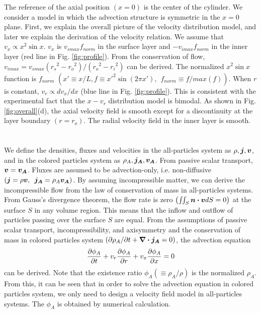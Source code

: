 \documentclass[prl,twocolumn,superscriptaddress]{revtex4}
\begin{document}
The reference of the axial position $(x=0)$ is the center of the cylinder. We consider a model in which the advection structure is symmetric in the $x=0$ plane. First, we explain the overall picture of the velocity distribution model, and later we explain the derivation of the velocity relation. We assume that $v_x\propto x^2\sin x$.  $v_x$ is $v_{smax}f_{norm}$ in the surface layer and $-v_{imax}f_{norm}$ in the inner layer (red line in Fig. \ref{fig:profile}). From the conservation of flow, $v_{imax}=v_{smax}({r_s}^2-{r_o}^2)/({r_o}^2-{r_i}^2)$ can be derived. The normalized $x^2\sin x$ function is $f_{norm}$ $(x'\equiv x/L, f\equiv {x'}^2\sin(2\pi x'),\hspace{5pt}f_{norm}\equiv f/max(f))$. When $r$ is constant, $v_r\propto dv_x/dx$ (blue line in Fig. \ref{fig:profile}). This is consistent with the experimental fact that the $x-v_r$ distribution model is bimodal. As shown in Fig. \ref{fig:overall}(d), the axial velocity field is smooth except for a discontinuity at the layer boundary $(r=r_o)$. The radial velocity field in the inner layer is smooth. \\
\\
 \\
We define the densities, fluxes and velocities in the all-particles system as $\rho, \vb*{j}, \vb*{v}$, and in the colored particles system as $\rho_A, \vb*{j_A}, \vb*{v_A}$. From passive scalar transport, $\vb*{v} = \vb*{v_A}$. Fluxes are assumed to be advection-only, i.e. non-diffusive $(\vb*{j} = \rho\vb*{v},\hspace{5pt}\vb*{j_A} = \rho_A\vb*{v_A})$. By assuming incompressible matter, we can derive the incompressible flow from the law of conservation of mass in all-particles systems. From Gauss's divergence theorem, the flow rate is zero $\qty(\iint\nolimits_S\vb*{n}\vdot\vb*{v}dS = 0)$ at the surface $S$ in any volume region. This means that the inflow and outflow of particles passing over the surface $S$ are equal. From the assumptions of passive scalar transport, incompressibility, and axisymmetry and the conservation of mass in colored particles system $\qty(\partial\rho_A/\partial t+\div{\vb*{j_A}}=0)$, the advection equation 
\begin{equation} \label{eq:2Dae}
\pdv{\phi_A}{t}+v_r\pdv{\phi_A}{r}+v_x\pdv{\phi_A}{x} = 0
\end{equation}
can be derived. Note that the existence ratio $\phi_A(\equiv\rho_A/\rho)$ is the normalized $\rho_A$. From this, it can be seen that in order to solve the advection equation in colored particles system, we only need to design a velocity field model in all-particles systems. The $\phi_A$ is obtained by numerical calculation. \\
\end{document}
